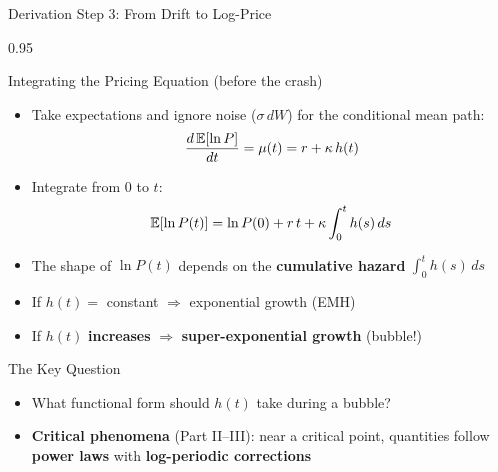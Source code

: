 \documentclass[9pt, aspectratio=169, t]{beamer}
\begin{document}
\begin{frame}{Derivation Step 3: From Drift to Log-Price}
    \begin{cminipage}{0.95\textwidth}
    {\footnotesize
    \begin{block}{Integrating the Pricing Equation (before the crash)}
        \begin{itemize}\setlength{\itemsep}{0pt}
            \item Take expectations and ignore noise ($\sigma\,dW$) for the conditional mean path:
            \vspace{-2mm}
                $$\frac{d\,\mathbb{E}[\ln P]}{dt} = \mu(t) = r + \kappa\, h(t)$$
            \vspace{-4mm}
            \item Integrate from $0$ to $t$:
            \vspace{-2mm}
                $$\mathbb{E}[\ln P(t)] = \ln P(0) + r\,t + \kappa \int_0^t h(s)\,ds$$
            \vspace{-4mm}
            \item The shape of $\ln P(t)$ depends on the \textbf{cumulative hazard} $\int_0^t h(s)\,ds$
            \item If $h(t) = $ constant $\Rightarrow$ exponential growth (EMH)
            \item If $h(t)$ \textbf{increases} $\Rightarrow$ \textbf{super-exponential growth} (bubble!)
        \end{itemize}
    \end{block}

    \vspace{-2mm}

    \begin{alertblock}{The Key Question}
        \begin{itemize}\setlength{\itemsep}{0pt}
            \item What functional form should $h(t)$ take during a bubble?
            \item \textbf{Critical phenomena} (Part II--III): near a critical point, quantities follow \textbf{power laws} with \textbf{log-periodic corrections}
        \end{itemize}
    \end{alertblock}
    }
    \end{cminipage}
\end{frame}
\end{document}
